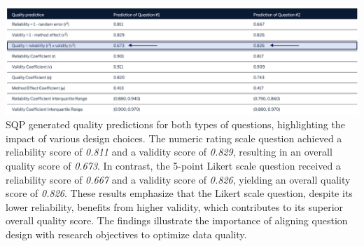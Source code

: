\documentclass[
  letterpaper,
  DIV=11,
  numbers=noendperiod]{scrartcl}
\begin{document}
\includegraphics{img/rating.png} SQP generated quality predictions for
both types of questions, highlighting the impact of various design
choices. The numeric rating scale question achieved a reliability score
of \emph{0.811} and a validity score of \emph{0.829}, resulting in an
overall quality score of \emph{0.673}. In contrast, the 5-point Likert
scale question received a reliability score of \emph{0.667} and a
validity score of \emph{0.826}, yielding an overall quality score of
\emph{0.826}. These results emphasize that the Likert scale question,
despite its lower reliability, benefits from higher validity, which
contributes to its superior overall quality score. The findings
illustrate the importance of aligning question design with research
objectives to optimize data quality.
\end{document}
